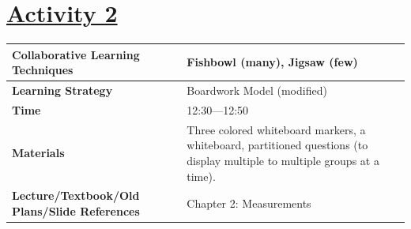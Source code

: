 \documentclass{article}
\begin{document}
{\section*{\underline{Activity 2}}
\begin{tabular}{|p{4.5cm}|p{9.5cm}|}
\hline
\textbf{Collaborative Learning Techniques} & Fishbowl (many), Jigsaw (few) \\
\hline
\textbf{Learning Strategy} &  Boardwork Model (modified) \\
\hline
\textbf{Time} & 12:30---12:50 \\
\hline
\textbf{Materials} & Three colored whiteboard markers, a whiteboard, partitioned questions (to display multiple to multiple groups at a time). \\
\hline
\textbf{Lecture/Textbook/Old Plans/Slide References} & Chapter 2: Measurements \\
\hline
\end{tabular}

}
\end{document}
